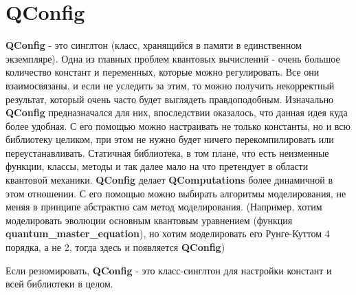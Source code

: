 \documentclass[12pt,fleqn]{article}
\begin{document}
    \section{\textbf{QConfig}}
    \textbf{QConfig} - это синглтон (класс, хранящийся в памяти в единственном экземпляре). Одна из главных проблем квантовых вычислений - очень большое количество констант и переменных,
    которые можно регулировать. Все они взаимосвязаны, и если не уследить за этим, то можно получить некорректный результат, который очень часто будет выглядеть правдоподобным.
    Изначально \textbf{QConfig} предназначался для них, впоследствии оказалось, что данная идея куда более удобная. С его помощью можно настраивать не только константы, но и 
    всю библиотеку целиком, при этом не нужно будет ничего перекомпилировать или переустанавливать.
    Статичная библиотека, в том плане, что есть неизменные функции, классы, методы и так далее мало на что претендует в области квантовой механики.
    \textbf{QConfig} делает \textbf{QComputations} более динамичной в этом отношении. С его помощью можно выбирать алгоритмы моделирования, не меняя в принципе абстрактно сам метод моделирования.
    (Например, хотим моделировать эволюции основным квантовым уравнением (функция \textbf{quantum\_master\_equation}), но хотим моделировать его
    \textsf{Рунге-Куттом} 4 порядка, а не 2, тогда здесь и появляется \textbf{QConfig})

    Если резюмировать, \textbf{QConfig} - это класс-синглтон для настройки констант и всей библиотеки в целом.
\end{document}
